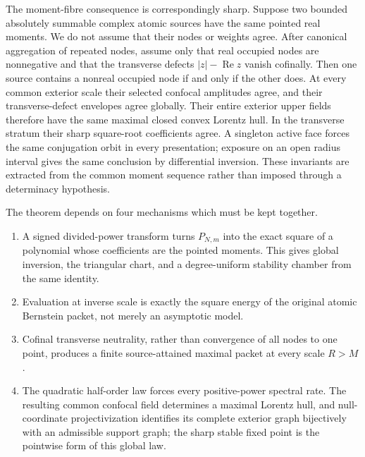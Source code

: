 \documentclass[11pt]{article}
\theoremstyle{remark}
\newcommand{\Rea}{\operatorname{Re}}
\begin{document}
The moment-fibre consequence is correspondingly sharp.  Suppose two bounded
absolutely summable complex atomic sources have the same pointed real moments.  We do not assume
that their nodes or weights agree.  After canonical aggregation of repeated nodes, assume only
that real occupied nodes are nonnegative and that the transverse defects $|z|-\Rea z$ vanish
cofinally.  Then one source contains a nonreal occupied node if and only if the other does.  At
every common exterior scale their selected confocal amplitudes agree, and their transverse-defect
envelopes agree globally.  Their entire exterior upper fields therefore have the same maximal
closed convex Lorentz hull.  In the transverse stratum their sharp square-root coefficients agree.
A singleton active face forces the same conjugation orbit in every presentation; exposure on an
open radius interval gives the same conclusion by differential inversion.  These invariants are
extracted from the common moment sequence rather than imposed through a determinacy hypothesis.

The theorem depends on four mechanisms which must be kept together.
\begin{enumerate}
\item A signed divided-power transform turns $P_{N,m}$ into the exact square of a polynomial whose
      coefficients are the pointed moments.  This gives global inversion, the triangular chart,
      and a degree-uniform stability chamber from the same identity.
\item Evaluation at inverse scale is exactly the square energy of the original atomic Bernstein
      packet, not merely an asymptotic model.
\item Cofinal transverse neutrality, rather than convergence of all nodes to one point, produces
      a finite source-attained maximal packet at every scale $R>M$.
\item The quadratic half-order law forces every positive-power spectral rate.  The resulting
      common confocal field determines a maximal Lorentz hull, and null-coordinate
      projectivization identifies its complete exterior graph bijectively with an admissible
      support graph; the sharp stable fixed point is the pointwise form of this global law.
\end{enumerate}
\end{document}
